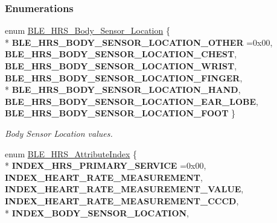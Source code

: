 \subsubsection*{Enumerations}
\begin{DoxyCompactItemize}
\item 
enum \hyperlink{group___b_l_e___h_r_s_gaf588708e263525a6606cc643e22d55a6}{B\+L\+E\+\_\+\+H\+R\+S\+\_\+\+Body\+\_\+\+Sensor\+\_\+\+Location} \{ \\*
{\bfseries B\+L\+E\+\_\+\+H\+R\+S\+\_\+\+B\+O\+D\+Y\+\_\+\+S\+E\+N\+S\+O\+R\+\_\+\+L\+O\+C\+A\+T\+I\+O\+N\+\_\+\+O\+T\+H\+ER} =0x00, 
{\bfseries B\+L\+E\+\_\+\+H\+R\+S\+\_\+\+B\+O\+D\+Y\+\_\+\+S\+E\+N\+S\+O\+R\+\_\+\+L\+O\+C\+A\+T\+I\+O\+N\+\_\+\+C\+H\+E\+ST}, 
{\bfseries B\+L\+E\+\_\+\+H\+R\+S\+\_\+\+B\+O\+D\+Y\+\_\+\+S\+E\+N\+S\+O\+R\+\_\+\+L\+O\+C\+A\+T\+I\+O\+N\+\_\+\+W\+R\+I\+ST}, 
{\bfseries B\+L\+E\+\_\+\+H\+R\+S\+\_\+\+B\+O\+D\+Y\+\_\+\+S\+E\+N\+S\+O\+R\+\_\+\+L\+O\+C\+A\+T\+I\+O\+N\+\_\+\+F\+I\+N\+G\+ER}, 
\\*
{\bfseries B\+L\+E\+\_\+\+H\+R\+S\+\_\+\+B\+O\+D\+Y\+\_\+\+S\+E\+N\+S\+O\+R\+\_\+\+L\+O\+C\+A\+T\+I\+O\+N\+\_\+\+H\+A\+ND}, 
{\bfseries B\+L\+E\+\_\+\+H\+R\+S\+\_\+\+B\+O\+D\+Y\+\_\+\+S\+E\+N\+S\+O\+R\+\_\+\+L\+O\+C\+A\+T\+I\+O\+N\+\_\+\+E\+A\+R\+\_\+\+L\+O\+BE}, 
{\bfseries B\+L\+E\+\_\+\+H\+R\+S\+\_\+\+B\+O\+D\+Y\+\_\+\+S\+E\+N\+S\+O\+R\+\_\+\+L\+O\+C\+A\+T\+I\+O\+N\+\_\+\+F\+O\+OT}
 \}\hypertarget{group___b_l_e___h_r_s_gaf588708e263525a6606cc643e22d55a6}{}\label{group___b_l_e___h_r_s_gaf588708e263525a6606cc643e22d55a6}
\begin{DoxyCompactList}\small\item\em Body Sensor Location values. \end{DoxyCompactList}
\item 
enum \hyperlink{group___b_l_e___h_r_s_ga0804d16a5e96316dee3d48a5eed71644}{B\+L\+E\+\_\+\+H\+R\+S\+\_\+\+Attribute\+Index} \{ \\*
{\bfseries I\+N\+D\+E\+X\+\_\+\+H\+R\+S\+\_\+\+P\+R\+I\+M\+A\+R\+Y\+\_\+\+S\+E\+R\+V\+I\+CE} =0x00, 
{\bfseries I\+N\+D\+E\+X\+\_\+\+H\+E\+A\+R\+T\+\_\+\+R\+A\+T\+E\+\_\+\+M\+E\+A\+S\+U\+R\+E\+M\+E\+NT}, 
{\bfseries I\+N\+D\+E\+X\+\_\+\+H\+E\+A\+R\+T\+\_\+\+R\+A\+T\+E\+\_\+\+M\+E\+A\+S\+U\+R\+E\+M\+E\+N\+T\+\_\+\+V\+A\+L\+UE}, 
{\bfseries I\+N\+D\+E\+X\+\_\+\+H\+E\+A\+R\+T\+\_\+\+R\+A\+T\+E\+\_\+\+M\+E\+A\+S\+U\+R\+E\+M\+E\+N\+T\+\_\+\+C\+C\+CD}, 
\\*
{\bfseries I\+N\+D\+E\+X\+\_\+\+B\+O\+D\+Y\+\_\+\+S\+E\+N\+S\+O\+R\+\_\+\+L\+O\+C\+A\+T\+I\+ON}, 

\end{DoxyCompactItemize}
